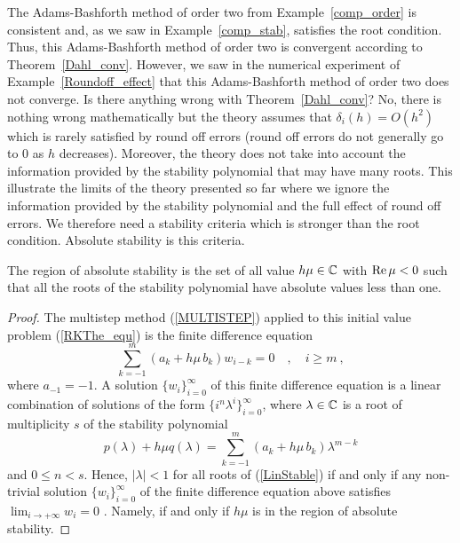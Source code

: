 \begin{rmk}
The Adams-Bashforth method of order two from Example~\ref{comp_order} is
consistent and, as we saw in Example~\ref{comp_stab}, satisfies the
root condition.   Thus, this Adams-Bashforth method of order two is
convergent according to Theorem~\ref{Dahl_conv}.  However, we saw in the
numerical experiment of Example~\ref{Roundoff_effect} that this
Adams-Bashforth method of order two does not converge.  Is there
anything wrong with Theorem~\ref{Dahl_conv}?  No, there is nothing wrong
mathematically but the theory assumes that $\delta_i(h) = O(h^2)$
which is rarely satisfied by round off errors (round off errors
do not generally go to $0$ as $h$ decreases).  Moreover, the theory
does not take into account the information provided by the stability
polynomial that may have many roots.  This illustrate the limits
of the theory presented so far where we ignore the information
provided by the stability polynomial and the full effect of round off
errors.   We therefore need a stability criteria which is stronger
than the root condition.  Absolute stability is this criteria.
\end{rmk}

\begin{prop}
The region of absolute stability is the set of all value
$h\mu \in \mathbb{C}$ with $\operatorname{Re} \mu < 0$ such that
all the roots of the stability polynomial have absolute
values less than one.
\end{prop}

\begin{proof}
The multistep method (\ref{MULTISTEP}) applied to this initial value
problem (\ref{RKThe_equ}) is the finite difference equation
\[
\sum_{k=-1}^m (a_k + h\mu\,b_k) w_{i-k} = 0 \quad , \quad i \geq m \ ,
\]
where $a_{-1} = -1$.  A solution
$\{w_i\}_{i=0}^\infty$ of this finite difference equation is a linear
combination of solutions of the form  $\{i^n\lambda^i\}_{i=0}^\infty$,
where $\lambda \in \mathbb{C}$ is a root of multiplicity $s$ of the stability
polynomial
\begin{equation}\label{LinStable}
p(\lambda) + h\mu q(\lambda)
= \sum_{k=-1}^m (a_k + h\mu\, b_k) \lambda^{m-k}
\end{equation}
and $0 \leq n <s$.  Hence, $|\lambda| <1$ for all roots of (\ref{LinStable})
if and only if any non-trivial solution $\{w_i\}_{i=0}^\infty$ of
the finite difference equation above 
satisfies $\displaystyle \lim_{i\rightarrow +\infty} w_i = 0$ .  Namely,
if and only if $h\mu$ is in the region of absolute stability.
\end{proof}

